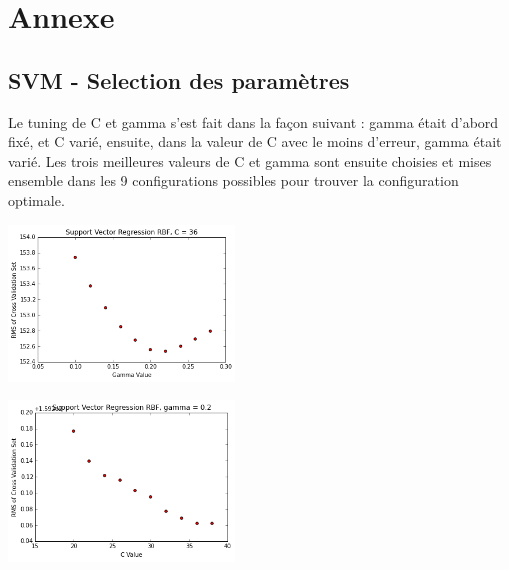 \documentclass[a4paper]{article}
\begin{document}
\clearpage

\section{Annexe}

\subsection{SVM - Selection des paramètres}
\begin{multicols}{2}

Le tuning de C et gamma s’est fait dans la façon suivant : gamma était d’abord fixé, et C varié, ensuite, dans la valeur de C avec le moins d’erreur, gamma était varié. Les trois meilleures valeurs de C et gamma sont ensuite choisies et mises ensemble dans les 9 configurations possibles pour trouver la configuration optimale. 

\includegraphics[width=0.45\textwidth]{./images/svmselectgamma.png}

\includegraphics[width=0.45\textwidth]{./images/svmselectc.png}

\end{multicols}
\end{document}
